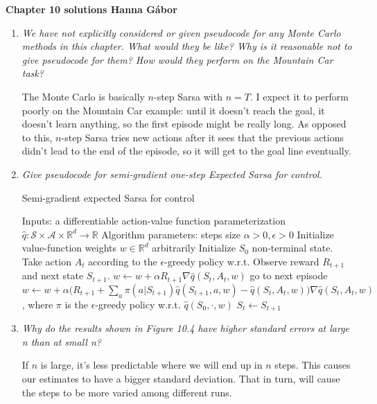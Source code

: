 \documentclass[12pt,a4paper]{article}
\begin{document}
\textbf{Chapter 10 solutions  \hfill Hanna Gábor}

\begin{enumerate}
  \item \textit{We have not explicitly considered or given pseudocode for any Monte Carlo
  methods in this chapter. What would they be like? Why is it reasonable not to give
  pseudocode for them? How would they perform on the Mountain Car task?}

  The Monte Carlo is basically $n$-step Sarsa with $n = T$. I expect it to perform
  poorly on the Mountain Car example: until it doesn't reach the goal, it doesn't
  learn anything, so the first episode might be really long.
  As opposed to this, $n$-step Sarsa tries new actions after it sees
  that the previous actions didn't lead to the end of the episode, so it will
  get to the goal line eventually.

  \item \textit{Give pseudocode for semi-gradient one-step Expected Sarsa for control.}

  \begin{algorithm}
    \caption{Semi-gradient expected Sarsa for control}
    \begin{algorithmic}
      \STATE Inputs: a differentiable action-value function parameterization
      $\hat{q}: \mathcal{S} \times \mathcal{A} \times \mathbb{R}^d \rightarrow \mathbb{R}$
      \STATE Algorithm parameters: steps size $\alpha > 0, \epsilon > 0$
      \STATE Initialize value-function weights $w \in \mathbb{R}^d$ arbitrarily
        \STATE Initialize $S_0$ non-terminal state.
          \STATE Take action $A_t$ according to the $\epsilon$-greedy policy w.r.t.
          \STATE Observe reward $R_{t + 1}$ and next state $S_{t + 1}$.
            \STATE $w \leftarrow w + \alpha R_{t + 1} \nabla\hat{q}(S_t, A_t, w)$
            \STATE go to next episode
          \ELSE
            \STATE $w \leftarrow w + \alpha\Big(R_{t + 1} + \sum\limits_a\pi(a|S_{t + 1})
            \hat{q}(S_{t + 1}, a, w) - \hat{q}(S_t, A_t, w)\Big)
            \nabla\hat{q}(S_t, A_t, w)$, where $\pi$ is the $\epsilon$-greedy policy w.r.t.
            $\hat{q}(S_0, \cdot, w)$
            \STATE $S_t \leftarrow S_{t + 1}$
          \ENDIF
        \ENDFOR
      \ENDFOR
    \end{algorithmic}
  \end{algorithm}

  \item \textit{Why do the results shown in Figure 10.4 have higher standard errors at
  large n than at small n?}

  If $n$ is large, it's less predictable where we will end up in $n$ steps. This causes
  our estimates to have a bigger standard deviation. That in turn, will cause the steps
  to be more varied among different runs.
  

\end{enumerate}
\end{document}
